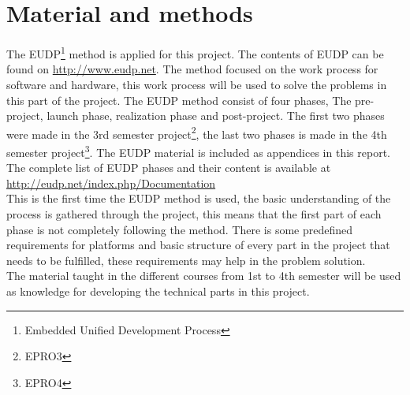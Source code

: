 \chapter{Material and methods}
The EUDP\footnote{Embedded Unified Development Process} method is applied for this project. The contents of EUDP can be found on \url{http://www.eudp.net}. The method focused on the work process for software and hardware, this work process will be used to solve the problems in this part of the project. The EUDP method consist of four phases, The pre-project, launch phase, realization phase and post-project. The first two phases were made in the 3rd semester project\footnote{EPRO3}, the last two phases is made in the 4th semester project\footnote{EPRO4}. The EUDP material is included as appendices in this report. The complete list of EUDP phases and their content is available at \url{http://eudp.net/index.php/Documentation}\\
This is the first time the EUDP method is used, the basic understanding of the process is gathered through the project, this means that the first part of each phase is not completely following the method.
There is some predefined requirements for platforms and basic structure of every part in the project that needs to be fulfilled, these requirements may help in the problem solution.\\
The material taught in the different courses from 1st to 4th semester will be used as knowledge for developing the technical parts in this project.\\
